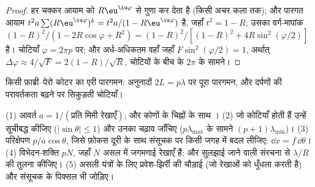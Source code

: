 \begin{proof}
हर चक्कर आयाम को $R\eu^{\iu\varphi}$ से गुणा कर देता है (किसी
अचर कला तक); और पारगत आयाम $t^2a\sum(R\eu^{\iu\varphi})^k =
t^2a/(1 - R\eu^{\iu\varphi})$ है, जहाँ $t^2 = 1 - R$; उसका वर्ग-मापांक $(1 - R)^2/
(1 - 2R\cos\varphi + R^2) = (1 - R)^2/[(1 - R)^2 + 4R\sin^2(\varphi/2)]$ है। चोटियाँ
$\varphi = 2\pi p$ पर; और अर्ध-अधिकतम वहाँ जहाँ $F\sin^2(\varphi/2) = 1$, अर्थात् $\Delta\varphi \approx
4/\sqrt F = 2(1 - R)/\sqrt R$, चोटियों के बीच के $2\pi$ के सामने।
\end{proof}

\begin{omfigure}

{\small किसी फ़ाब्री--पेरो कोटर का एरी पारगमन: अनुनादों $2L = p\lambda$ पर
पूरा पारगमन, और दर्पणों की परावर्तकता बढ़ने पर सिकुड़ती
चोटियाँ।}
\end{omfigure}

\begin{method}[जालक की गणनाएँ]\label{met:b2:gratings:method}
(1) आवर्त $a = 1/(\text{प्रति मिमी रेखाएँ})$; और कोणों के चिह्नों के साथ । (2) जो कोटियाँ होती हैं उन्हें सूचीबद्ध कीजिए ($|\sin\theta| \le 1$)
और उनका चढ़ाव जाँचिए ($p\lambda_{\max}$ के सामने $(p + 1)\lambda_{\min}$)। (3)
परिक्षेपण $p/a\cos\theta$, जिसे फ़ोकस दूरी के साथ संसूचक पर किसी जगह में बदल
लीजिए: $\dd x = f\,\dd\theta$। (4) विभेदन-शक्ति $pN$, जहाँ $N$ असल में
जगमगाई रेखाएँ हैं; और सुलझाई जाने वाली संरचना से $\lambda/R$ की तुलना कीजिए। (5) असली यंत्रों के लिए
प्रवेश-झिर्री की चौड़ाई (जो रेखाओं को धुँधला करती है) और संसूचक के पिक्सल भी जोड़िए।
\end{method}

